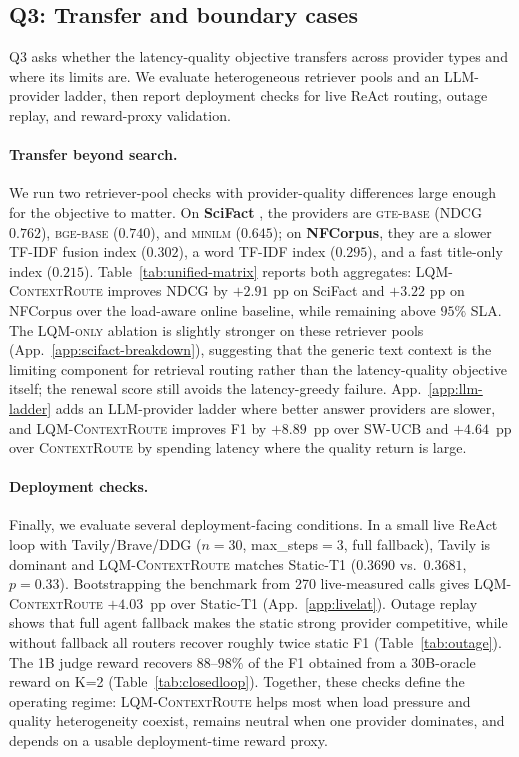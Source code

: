 \documentclass[11pt]{article}
\newcommand{\contextroute}{\textsc{ContextRoute}}
\newcommand{\swucb}{\textsc{SW-UCB}}
\newcommand{\lqm}{\textsc{LQM-only}}
\newcommand{\lqmcr}{\textsc{LQM-ContextRoute}}
\begin{document}
\subsection{Q3: Transfer and boundary cases}
\label{sec:eval-scifact}
\label{sec:eval-agent}\label{sec:eval-measured}\label{sec:eval-recovery}

Q3 asks whether the latency-quality objective transfers across provider types and where its limits are. We evaluate heterogeneous retriever pools and an LLM-provider ladder, then report deployment checks for live ReAct routing, outage replay, and reward-proxy validation.

\paragraph{Transfer beyond search.} We run two retriever-pool checks with provider-quality differences large enough for the objective to matter. On \textbf{SciFact} \citep{wadden2020fact}, the providers are \textsc{gte-base} (NDCG $0.762$), \textsc{bge-base} ($0.740$), and \textsc{minilm} ($0.645$); on \textbf{NFCorpus}, they are a slower TF-IDF fusion index ($0.302$), a word TF-IDF index ($0.295$), and a fast title-only index ($0.215$). Table~\ref{tab:unified-matrix} reports both aggregates: \lqmcr{} improves NDCG by $+2.91$ pp on SciFact and $+3.22$ pp on NFCorpus over the load-aware online baseline, while remaining above $95\%$ SLA. The \lqm{} ablation is slightly stronger on these retriever pools (App.~\ref{app:scifact-breakdown}), suggesting that the generic text context is the limiting component for retrieval routing rather than the latency-quality objective itself; the renewal score still avoids the latency-greedy failure. App.~\ref{app:llm-ladder} adds an LLM-provider ladder where better answer providers are slower, and \lqmcr{} improves F1 by $+8.89$~pp over \swucb{} and $+4.64$~pp over \contextroute{} by spending latency where the quality return is large.

\paragraph{Deployment checks.} Finally, we evaluate several deployment-facing conditions. In a small live ReAct loop with Tavily/Brave/DDG ($n{=}30$, max\_steps$=3$, full fallback), Tavily is dominant and \lqmcr{} matches Static-T1 ($0.3690$ vs.\ $0.3681$, $p{=}0.33$). Bootstrapping the benchmark from 270 live-measured calls gives \lqmcr{} $+4.03$~pp over Static-T1 (App.~\ref{app:livelat}). Outage replay shows that full agent fallback makes the static strong provider competitive, while without fallback all routers recover roughly twice static F1 (Table~\ref{tab:outage}). The 1B judge reward recovers $88$--$98\%$ of the F1 obtained from a 30B-oracle reward on K=2 (Table~\ref{tab:closedloop}). Together, these checks define the operating regime: \lqmcr{} helps most when load pressure and quality heterogeneity coexist, remains neutral when one provider dominates, and depends on a usable deployment-time reward proxy.
\end{document}
